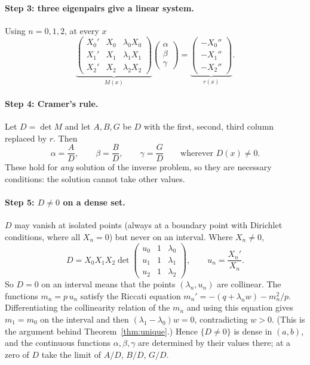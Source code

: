 \documentclass[11pt]{article}
\theoremstyle{remark}
\begin{document}
\paragraph{Step 3: three eigenpairs give a linear system.}
Using $n=0,1,2$, at every $x$
\begin{equation}\label{eq:system}
  \underbrace{\begin{pmatrix}
    X_0' & X_0 & \lambda_0X_0\\
    X_1' & X_1 & \lambda_1X_1\\
    X_2' & X_2 & \lambda_2X_2
  \end{pmatrix}}_{M(x)}
  \begin{pmatrix}\alpha\\ \beta\\ \gamma\end{pmatrix}
  =
  \underbrace{\begin{pmatrix}-X_0''\\ -X_1''\\ -X_2''\end{pmatrix}}_{r(x)} .
\end{equation}

\paragraph{Step 4: Cramer's rule.}
Let $D=\det M$ and let $A,B,G$ be $D$ with the first, second, third column
replaced by $r$. Then
\[
  \alpha=\frac AD,\qquad \beta=\frac BD,\qquad \gamma=\frac GD
  \qquad\text{wherever }D(x)\ne0 .
\]
These hold for \emph{any} solution of the inverse problem, so they are
necessary conditions: the solution cannot take other values.

\paragraph{Step 5: $D\ne0$ on a dense set.}
$D$ may vanish at isolated points (always at a boundary point with Dirichlet
conditions, where all $X_n=0$) but never on an interval. Where $X_n\ne0$,
\[
  D=X_0X_1X_2\det\begin{pmatrix}u_0&1&\lambda_0\\u_1&1&\lambda_1\\u_2&1&\lambda_2\end{pmatrix},
  \qquad u_n=\frac{X_n'}{X_n}.
\]
So $D=0$ on an interval means that the points $(\lambda_n,u_n)$ are collinear.
The functions $m_n=p\,u_n$ satisfy the Riccati equation
$m_n'=-(q+\lambda_nw)-m_n^2/p$. Differentiating the collinearity relation of
the $m_n$ and using this equation gives $m_1=m_0$ on the interval and then
$(\lambda_1-\lambda_0)w=0$, contradicting $w>0$. (This is the argument behind
Theorem~\ref{thm:unique}.) Hence $\{D\ne0\}$ is dense in $(a,b)$, and the
continuous functions $\alpha,\beta,\gamma$ are determined by their values
there; at a zero of $D$ take the limit of $A/D$, $B/D$, $G/D$.
\end{document}
